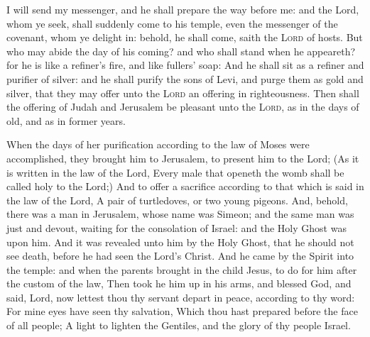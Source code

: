  I will send my messenger, and he shall prepare the way before me: and the Lord, whom ye seek, shall suddenly come to his temple, even the messenger of the covenant, whom ye delight in: behold, he shall come, saith the \textsc{Lord} of hosts. But who may abide the day of his coming? and who shall stand when he appeareth? for he is like a refiner's fire, and like fullers' soap: And he shall sit as a refiner and purifier of silver: and he shall purify the sons of Levi, and purge them as gold and silver, that they may offer unto the \textsc{Lord} an offering in righteousness. Then shall the offering of Judah and Jerusalem be pleasant unto the \textsc{Lord}, as in the days of old, and as in former years.

 When the days of her purification according to the law of Moses were accomplished, they brought him to Jerusalem, to present him to the Lord; (As it is written in the law of the Lord, Every male that openeth the womb shall be called holy to the Lord;) And to offer a sacrifice according to that which is said in the law of the Lord, A pair of turtledoves, or two young pigeons. And, behold, there was a man in Jerusalem, whose name was Simeon; and the same man was just and devout, waiting for the consolation of Israel: and the Holy Ghost was upon him. And it was revealed unto him by the Holy Ghost, that he should not see death, before he had seen the Lord's Christ. And he came by the Spirit into the temple: and when the parents brought in the child Jesus, to do for him after the custom of the law, Then took he him up in his arms, and blessed God, and said, Lord, now lettest thou thy servant depart in peace, according to thy word: For mine eyes have seen thy salvation, Which thou hast prepared before the face of all people; A light to lighten the Gentiles, and the glory of thy people Israel.



